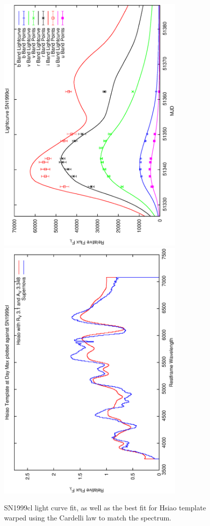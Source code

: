 \clearpage

\begin{figure}[p]
\centering
\includegraphics[angle=-90,width=0.8\textwidth]{./figures/ltcv/SN1999cl_v024_lightcurve.ps}
\hfill
\includegraphics[angle=-90,width=0.8\textwidth]{./figures/hsiao/SN1999cl_v001_hsiao.ps}
\hfill
\caption{SN1999cl light curve fit, as well as the best fit for Hsiao template warped using the Cardelli law to match the spectrum.}
\label{fig:SN1999clfour2}
\end{figure}

